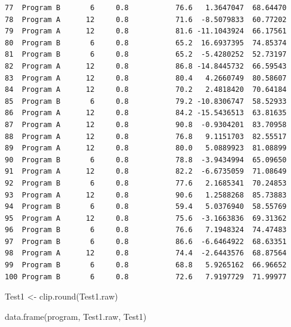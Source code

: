 \documentclass[
  letterpaper,
  DIV=11,
  numbers=noendperiod]{scrreprt}
\newenvironment{Shaded}{\begin{snugshade}}{\end{snugshade}}
\newcommand{\FunctionTok}[1]{\textcolor[rgb]{0.28,0.35,0.67}{#1}}
\newcommand{\NormalTok}[1]{\textcolor[rgb]{0.00,0.23,0.31}{#1}}
\newcommand{\OtherTok}[1]{\textcolor[rgb]{0.00,0.23,0.31}{#1}}
\begin{document}
\begin{verbatim}
77  Program B       6     0.8           76.6   1.3647047  68.64470
78  Program A      12     0.8           71.6  -8.5079833  60.77202
79  Program A      12     0.8           81.6 -11.1043924  66.17561
80  Program B       6     0.8           65.2  16.6937395  74.85374
81  Program B       6     0.8           65.2  -5.4280252  52.73197
82  Program A      12     0.8           86.8 -14.8445732  66.59543
83  Program A      12     0.8           80.4   4.2660749  80.58607
84  Program A      12     0.8           70.2   2.4818420  70.64184
85  Program B       6     0.8           79.2 -10.8306747  58.52933
86  Program A      12     0.8           84.2 -15.5436513  63.81635
87  Program A      12     0.8           90.8  -0.9304201  83.70958
88  Program A      12     0.8           76.8   9.1151703  82.55517
89  Program A      12     0.8           80.0   5.0889923  81.08899
90  Program B       6     0.8           78.8  -3.9434994  65.09650
91  Program A      12     0.8           82.2  -6.6735059  71.08649
92  Program B       6     0.8           77.6   2.1685341  70.24853
93  Program A      12     0.8           90.6   1.2588268  85.73883
94  Program B       6     0.8           59.4   5.0376940  58.55769
95  Program A      12     0.8           75.6  -3.1663836  69.31362
96  Program B       6     0.8           76.6   7.1948324  74.47483
97  Program B       6     0.8           86.6  -6.6464922  68.63351
98  Program A      12     0.8           74.4  -2.6443576  68.87564
99  Program B       6     0.8           68.8   5.9265162  66.96652
100 Program B       6     0.8           72.6   7.9197729  71.99977
\end{verbatim}

\begin{Shaded}
\begin{Highlighting}[]
\NormalTok{Test1 }\OtherTok{\textless{}{-}} \FunctionTok{clip.round}\NormalTok{(Test1.raw)}

\FunctionTok{data.frame}\NormalTok{(program, Test1.raw, Test1)}
\end{Highlighting}
\end{Shaded}
\end{document}
